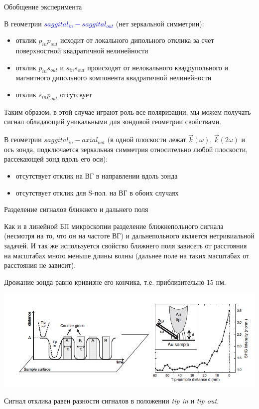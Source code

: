 \documentclass[9pt, compress, xcolor=table]{beamer}
\begin{document}
\begin{frame}{Обобщение эксперимента}

В геометрии \textcolor{blue}{$saggital_{in}-saggital_{out}$} (нет зеркальной симметрии):
\begin{itemize}
\item отклик $p_{in}p_{out}$ исходит от локального дипольного отклика за счет поверхностной квадратичной нелинейности
\item отклик $p_{in}s_{out}$ и $s_{in}s_{out}$ происходят от нелокального квадрупольного и магнитного дипольного компонента квадратичной нелинейности
\item отклик $s_{in}p_{out}$ отсутсвует
\end{itemize}

Таким образом, в этой случае играют роль все поляризации, мы можем получать сигнал обладающий уникальными для зондовой геометрии свойствами.

В геометрии  \textcolor{red!50!black}{$saggital_{in}-axial_{out}$} (в одной плоскости лежат $\vec k (\omega)$, $\vec k (2\omega)$ и ось зонда, подключается зеркальная симметрия относительно любой плоскости, рассекающей зонд вдоль его оси):
\begin{itemize}
\item отсутствует отклик на ВГ в направлении вдоль зонда
\item отсутствует отклик для S-пол. на ВГ в обоих случаях 

\end{itemize}
\end{frame}
 
\begin{frame}{Разделение сигналов ближнего и дальнего поля}

Как и в линейной БП микроскопии разделение ближнепольного сигнала (несмотря на то, что он на частоте ВГ) и дальнепольного является нетривиальной задачей. И так же используется свойство ближнего поля зависеть от расстояния на масштабах много меньше длины волны (дальнее поле на таких масштабах от расстояния не зависит). 

Дрожание зонда равно кривизне его кончика, т.е. приблизительно 15 нм.

\begin{center}
\includegraphics[width=\textwidth]{shg18}
\end{center}

Сигнал отклика равен разности сигналов в положении \emph{ tip in} и \it{tip out}.

\end{frame}
\end{document}
